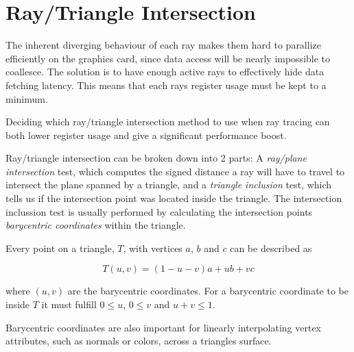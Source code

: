 \section{Ray/Triangle Intersection}

The inherent diverging behaviour of each ray makes them hard to
parallize efficiently on the graphics card, since data access will be
nearly impossible to coallesce. The solution is to have enough active
rays to effectively hide data fetching latency. This means that each
rays register usage must be kept to a minimum.

Deciding which ray/triangle intersection method to use when ray
tracing can both lower register usage and give a significant
performance boost.


Ray/triangle intersection can be broken down into 2 parts: A
\textit{ray/plane intersection} test, which computes the signed
distance a ray will have to travel to intersect the plane spanned by a
triangle, and a \textit{triangle inclusion} test, which tells us if
the intersection point was located inside the triangle. The
intersection inclussion test is usually performed by calculating the
intersection points \textit{barycentric coordinates} within the
triangle.

Every point on a triangle, $T$, with vertices $a$, $b$ and $c$ can be
described as 


\begin{displaymath}
  T(u,v) = (1-u-v)a + ub + vc
\end{displaymath}
 
where $(u, v)$ are the barycentric coordinates. For a barycentric
coordinate to be inside $T$ it must fulfill $0 \le u$, $0 \le v$ and
$u+v \le 1$.

Barycentric coordinates are also important for linearly interpolating
vertex attributes, such as normals or colors, across a triangles
surface.






